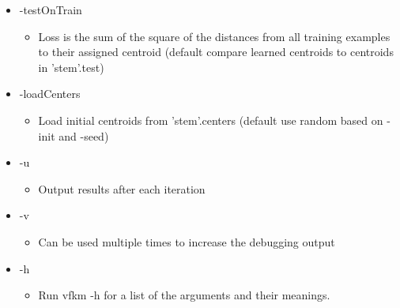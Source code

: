 \begin{itemize}
\item -test\-On\-Train\begin{itemize}
\item Loss is the sum of the square of the distances from all training examples to their assigned centroid (default compare learned centroids to centroids in 'stem'.test)\end{itemize}
\item -load\-Centers\begin{itemize}
\item Load initial centroids from 'stem'.centers (default use random based on -init and -seed)\end{itemize}
\item -u\begin{itemize}
\item Output results after each iteration\end{itemize}
\item -v\begin{itemize}
\item Can be used multiple times to increase the debugging output\end{itemize}
\item -h\begin{itemize}
\item Run vfkm -h for a list of the arguments and their meanings.\end{itemize}
\end{itemize}


